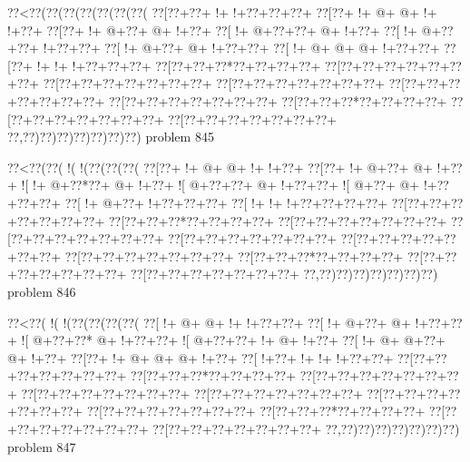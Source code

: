 \vbox{\vbox{\goo
\0??<\0??(\0??(\0??(\0??(\0??(\0??(\0??(
\0??[\0??+\0??+\- !+\- !+\0??+\0??+\0??+
\0??[\0??+\- !+\- @+\- @+\- !+\- !+\0??+
\0??[\0??+\- !+\- @+\0??+\- @+\- !+\0??+
\0??[\- !+\- @+\0??+\0??+\- @+\- !+\0??+
\0??[\- !+\- @+\0??+\0??+\- !+\0??+\0??+
\0??[\- !+\- @+\0??+\- @+\- !+\0??+\0??+
\0??[\- !+\- @+\- @+\- @+\- !+\0??+\0??+
\0??[\0??+\- !+\- !+\- !+\0??+\0??+\0??+
\0??[\0??+\0??+\0??*\0??+\0??+\0??+\0??+
\0??[\0??+\0??+\0??+\0??+\0??+\0??+\0??+
\0??[\0??+\0??+\0??+\0??+\0??+\0??+\0??+
\0??[\0??+\0??+\0??+\0??+\0??+\0??+\0??+
\0??[\0??+\0??+\0??+\0??+\0??+\0??+\0??+
\0??[\0??+\0??+\0??+\0??+\0??+\0??+\0??+
\0??[\0??+\0??+\0??*\0??+\0??+\0??+\0??+
\0??[\0??+\0??+\0??+\0??+\0??+\0??+\0??+
\0??[\0??+\0??+\0??+\0??+\0??+\0??+\0??+
\0??,\0??)\0??)\0??)\0??)\0??)\0??)\0??)
}
\hfil problem 845\hfil\break
}

\vbox{\vbox{\goo
\0??<\0??(\0??(\- !(\- !(\0??(\0??(\0??(
\0??[\0??+\- !+\- @+\- @+\- !+\- !+\0??+
\0??[\0??+\- !+\- @+\0??+\- @+\- !+\0??+
\- ![\- !+\- @+\0??*\0??+\- @+\- !+\0??+
\- ![\- @+\0??+\0??+\- @+\- !+\0??+\0??+
\- ![\- @+\0??+\- @+\- !+\0??+\0??+\0??+
\0??[\- !+\- @+\0??+\- !+\0??+\0??+\0??+
\0??[\- !+\- !+\- !+\0??+\0??+\0??+\0??+
\0??[\0??+\0??+\0??+\0??+\0??+\0??+\0??+
\0??[\0??+\0??+\0??*\0??+\0??+\0??+\0??+
\0??[\0??+\0??+\0??+\0??+\0??+\0??+\0??+
\0??[\0??+\0??+\0??+\0??+\0??+\0??+\0??+
\0??[\0??+\0??+\0??+\0??+\0??+\0??+\0??+
\0??[\0??+\0??+\0??+\0??+\0??+\0??+\0??+
\0??[\0??+\0??+\0??+\0??+\0??+\0??+\0??+
\0??[\0??+\0??+\0??*\0??+\0??+\0??+\0??+
\0??[\0??+\0??+\0??+\0??+\0??+\0??+\0??+
\0??[\0??+\0??+\0??+\0??+\0??+\0??+\0??+
\0??,\0??)\0??)\0??)\0??)\0??)\0??)\0??)
}
\hfil problem 846\hfil\break
}

\vbox{\vbox{\goo
\0??<\0??(\- !(\- !(\0??(\0??(\0??(\0??(
\0??[\- !+\- @+\- @+\- !+\- !+\0??+\0??+
\0??[\- !+\- @+\0??+\- @+\- !+\0??+\0??+
\- ![\- @+\0??+\0??*\- @+\- !+\0??+\0??+
\- ![\- @+\0??+\0??+\- !+\- @+\- !+\0??+
\0??[\- !+\- @+\- @+\0??+\- @+\- !+\0??+
\0??[\0??+\- !+\- @+\- @+\- @+\- !+\0??+
\0??[\- !+\0??+\- !+\- !+\- !+\0??+\0??+
\0??[\0??+\0??+\0??+\0??+\0??+\0??+\0??+
\0??[\0??+\0??+\0??*\0??+\0??+\0??+\0??+
\0??[\0??+\0??+\0??+\0??+\0??+\0??+\0??+
\0??[\0??+\0??+\0??+\0??+\0??+\0??+\0??+
\0??[\0??+\0??+\0??+\0??+\0??+\0??+\0??+
\0??[\0??+\0??+\0??+\0??+\0??+\0??+\0??+
\0??[\0??+\0??+\0??+\0??+\0??+\0??+\0??+
\0??[\0??+\0??+\0??*\0??+\0??+\0??+\0??+
\0??[\0??+\0??+\0??+\0??+\0??+\0??+\0??+
\0??[\0??+\0??+\0??+\0??+\0??+\0??+\0??+
\0??,\0??)\0??)\0??)\0??)\0??)\0??)\0??)
}
\hfil problem 847\hfil\break
}

